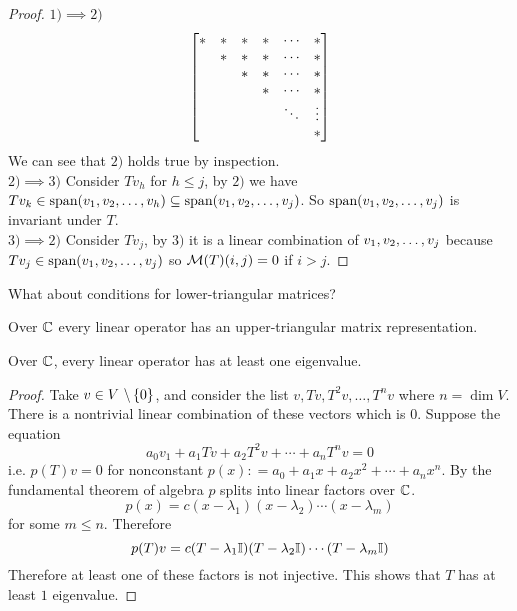 \begin{proof}
    $1) \implies 2) $ \[\begin{bmatrix} * & * & * & * & \cdots & * \\  & * & * & * & \cdots & * \\  &  & * & * & \cdots & * \\ & & & * & \cdots & * \\  & & & & \ddots & \vdots \\  & & & & & * \end{bmatrix}\] We can see that $2)$ holds true by inspection. \\
    $2) \implies 3)$ Consider $Tv_h$ for $h \leq j$, by $2)$ we have $Tv_k \in \text{span}({v}_1,{v}_2, \ldots, {v}_{h}) \subseteq \text{span} ({v}_1,{v}_2, \ldots, {v}_{j})$. So $\text{span} ({v}_1,{v}_2, \ldots, {v}_{j})$ is invariant under $T$. \\
    $3) \implies 2)$ Consider $Tv_j$, by $3)$ it is a linear combination of ${v}_1,{v}_2, \ldots, {v}_{j}$ because $Tv_j \in \text{span}({v}_1,{v}_2, \ldots, {v}_{j})$ so $\mathcal M(T)(i,j) = 0$ if $i > j$.
\end{proof}
\begin{question}
    What about conditions for lower-triangular matrices?
\end{question}
\begin{theorem}
    Over $\mathbb C$ every linear operator has an upper-triangular matrix representation.
\end{theorem}
\begin{lemma}
Over $\mathbb C$, every linear operator has at least one eigenvalue.
\end{lemma}
\begin{proof}
    Take $v \in V\ \backslash \left\{ 0 \right\}$, and consider the list $v, Tv, T^2v, \ldots, T^nv$ where $n = \dim V$. There is a nontrivial linear combination of these vectors which is $0$. Suppose the equation \[a_0v_1 + a_1Tv + a_2T^2v + \cdots + a_nT^nv = 0\]
    i.e. $p(T)v = 0$ for nonconstant $p(x) : = a_0 + a_1x + a_2x^2 + \cdots + a_nx^n$. By the fundamental theorem of algebra $p$ splits into linear factors over $\mathbb C$.
    \[ p(x) = c(x - \lambda_1)(x - \lambda_2) \cdots (x - \lambda_m)\] for some $m \leq n$. Therefore 
    \[ p(T)v = c(T - \lambda_1 \mathbb I)(T - \lambda_2  \mathbb I) \cdots (T - \lambda_m \mathbb I)\]
    Therefore at least one of these factors is not injective. This shows that $T$ has at least $1$ eigenvalue.
\end{proof}











